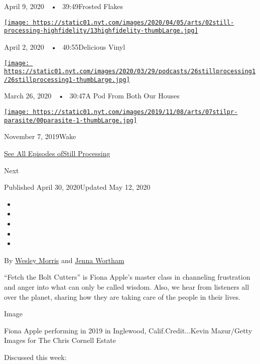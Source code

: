 April 9, 2020~~•~ 39:49Frosted Flakes

\href{https://www.nytimes.com/2020/04/02/podcasts/high-fidelity-zoe-kravitz.html?action=click\&module=audio-series-bar\&region=header\&pgtype=Article}{\texttt{[image: https://static01.nyt.com/images/2020/04/05/arts/02still-processing-highfidelity/13highfidelity-thumbLarge.jpg]}}

April 2, 2020~~•~ 40:55Delicious Vinyl

\href{https://www.nytimes.com/2020/03/26/podcasts/still-processing-quarantine.html?action=click\&module=audio-series-bar\&region=header\&pgtype=Article}{\texttt{[image: https://static01.nyt.com/images/2020/03/29/podcasts/26stillprocessing1/26stillprocessing1-thumbLarge.jpg]}}

March 26, 2020~~•~ 30:47A Pod From Both Our Houses

\href{https://www.nytimes.com/2019/11/07/podcasts/still-processing-parasite-watchmen-bong-joon-ho.html?action=click\&module=audio-series-bar\&region=header\&pgtype=Article}{\texttt{[image: https://static01.nyt.com/images/2019/11/08/arts/07stilpr-parasite/00parasite-1-thumbLarge.jpg]}}

November 7, 2019Wake

\href{https://www.nytimes.com/column/still-processing-podcast}{See All
Episodes ofStill Processing}

Next

Published April 30, 2020Updated May 12, 2020

\begin{itemize}
\item
\item
\item
\item
\item
\end{itemize}

By \href{https://www.nytimes.com/by/wesley-morris}{Wesley Morris} and
\href{https://www.nytimes.com/by/jenna-wortham}{Jenna Wortham}

``Fetch the Bolt Cutters'' is Fiona Apple's master class in channeling
frustration and anger into what can only be called wisdom. Also, we hear
from listeners all over the planet, sharing how they are taking care of
the people in their lives.

Image

Fiona Apple performing in 2019 in Inglewood, Calif.Credit...Kevin
Mazur/Getty Images for The Chris Cornell Estate

Discussed this week:

